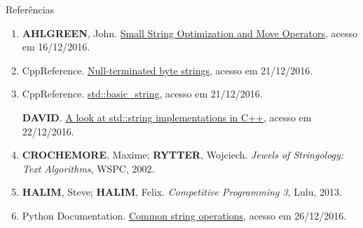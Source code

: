 \begin{frame}[fragile]{Referências}

    \begin{enumerate}
        \item \textbf{AHLGREEN}, John. \href{http://john-ahlgren.blogspot.com.br/2012/03/small-string-optimization-and-move.html}{Small String Optimization and Move Operators}, acesso em 16/12/2016.

        \item CppReference. \href{http://en.cppreference.com/w/cpp/string/byte}{Null-terminated byte strings}, acesso em 21/12/2016.

        \item CppReference. \href{http://en.cppreference.com/w/cpp/string/basic\_string}{std::basic\_string}, acesso em 21/12/2016.

        \textbf{DAVID}. \href{http://info.prelert.com/blog/cpp-stdstring-implementations}{A look at std::string implementations in C++}, acesso em 22/12/2016.
 
        \item \textbf{CROCHEMORE}, Maxime; \textbf{RYTTER}, Wojciech. \textit{Jewels of Stringology: Text Algorithms}, WSPC, 2002.

        \item \textbf{HALIM}, Steve; \textbf{HALIM}, Felix. \textit{Competitive Programming 3}, Lulu, 2013.
        \item Python Documentation. \href{https://docs.python.org/2/library/string.html}{Common string operations}, acesso em 26/12/2016.
    \end{enumerate}

\end{frame}
